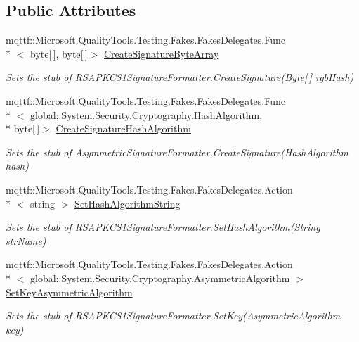 \subsection*{Public Attributes}
\begin{DoxyCompactItemize}
\item 
mqttf\-::\-Microsoft.\-Quality\-Tools.\-Testing.\-Fakes.\-Fakes\-Delegates.\-Func\\*
$<$ byte\mbox{[}$\,$\mbox{]}, byte\mbox{[}$\,$\mbox{]}$>$ \hyperlink{class_system_1_1_security_1_1_cryptography_1_1_fakes_1_1_stub_r_s_a_p_k_c_s1_signature_formatter_a4fdfd42f22de38b5e3ea044ec3305268}{Create\-Signature\-Byte\-Array}
\begin{DoxyCompactList}\small\item\em Sets the stub of R\-S\-A\-P\-K\-C\-S1\-Signature\-Formatter.\-Create\-Signature(\-Byte\mbox{[}$\,$\mbox{]} rgb\-Hash)\end{DoxyCompactList}\item 
mqttf\-::\-Microsoft.\-Quality\-Tools.\-Testing.\-Fakes.\-Fakes\-Delegates.\-Func\\*
$<$ global\-::\-System.\-Security.\-Cryptography.\-Hash\-Algorithm, \\*
byte\mbox{[}$\,$\mbox{]}$>$ \hyperlink{class_system_1_1_security_1_1_cryptography_1_1_fakes_1_1_stub_r_s_a_p_k_c_s1_signature_formatter_acd83fd68b7affbeaf29f2be89d8c8f63}{Create\-Signature\-Hash\-Algorithm}
\begin{DoxyCompactList}\small\item\em Sets the stub of Asymmetric\-Signature\-Formatter.\-Create\-Signature(\-Hash\-Algorithm hash)\end{DoxyCompactList}\item 
mqttf\-::\-Microsoft.\-Quality\-Tools.\-Testing.\-Fakes.\-Fakes\-Delegates.\-Action\\*
$<$ string $>$ \hyperlink{class_system_1_1_security_1_1_cryptography_1_1_fakes_1_1_stub_r_s_a_p_k_c_s1_signature_formatter_a7e17f3c4cb25bad35778ced0bef583e9}{Set\-Hash\-Algorithm\-String}
\begin{DoxyCompactList}\small\item\em Sets the stub of R\-S\-A\-P\-K\-C\-S1\-Signature\-Formatter.\-Set\-Hash\-Algorithm(\-String str\-Name)\end{DoxyCompactList}\item 
mqttf\-::\-Microsoft.\-Quality\-Tools.\-Testing.\-Fakes.\-Fakes\-Delegates.\-Action\\*
$<$ global\-::\-System.\-Security.\-Cryptography.\-Asymmetric\-Algorithm $>$ \hyperlink{class_system_1_1_security_1_1_cryptography_1_1_fakes_1_1_stub_r_s_a_p_k_c_s1_signature_formatter_aa50462c44ae22c672b258d70e91be344}{Set\-Key\-Asymmetric\-Algorithm}
\begin{DoxyCompactList}\small\item\em Sets the stub of R\-S\-A\-P\-K\-C\-S1\-Signature\-Formatter.\-Set\-Key(\-Asymmetric\-Algorithm key)\end{DoxyCompactList}\end{DoxyCompactItemize}
